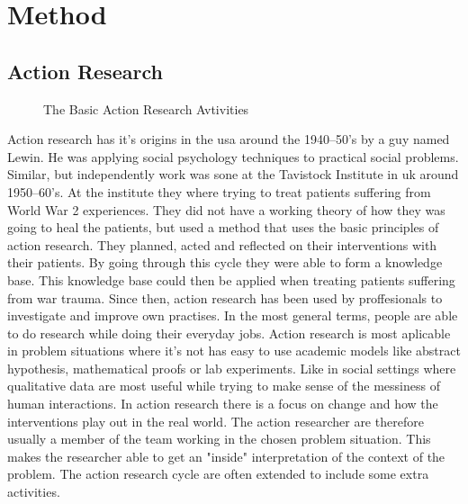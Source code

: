 \chapter{Method}
\section{Action Research}	
\begin{figure}
\centering
\caption{The Basic Action Research Avtivities}
\label{fig:basicactivity}
\end{figure}
Action research has it's origins in the \gls{usa} around the 1940--50's by a guy named Lewin.
He was applying social psychology techniques to practical social problems. 
Similar, but independently work was sone at the Tavistock Institute in \gls{uk} around 1950--60's.
At the institute they where trying to treat patients suffering from World War 2 experiences. 
They did not have a working theory of how they was going to heal the patients, but used a method that uses the basic principles of action research.
They planned, acted and reflected on their interventions with their patients. 
By going through this cycle they were able to form a knowledge base.
This knowledge base could then be applied when treating patients suffering from war trauma.
Since then, action research has been used by proffesionals to investigate and improve own practises.
In the most general terms, people are able to do research while doing their everyday jobs.
Action research is most aplicable in problem situations where it's not has easy to use academic models like abstract hypothesis, mathematical proofs or lab experiments. Like in social settings where qualitative data are most useful while trying to make sense of the messiness of human interactions.
In action research there is a focus on change and how the interventions play out in the real world.
The action researcher are therefore usually a member of the team working in the chosen problem situation.
This makes the researcher able to get an "inside" interpretation of the context of the problem.
The action research cycle are often extended to include some extra activities. 
